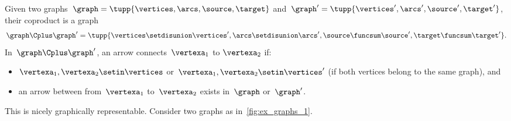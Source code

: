\begin{example}
    \label{def:ex_graph}
    Given two graphs~$\graph=\tupp{\vertices,\arcs,\source,\target}$ and~$\graph'=\tupp{\vertices',\arcs',\source',\target'}$, their coproduct is a graph
    \begin{equation}
        \graph\Cplus\graph'=\tupp{\vertices \setdisunion\vertices',\arcs \setdisunion\arcs',\source\funcsum\source',\target\funcsum\target'}.
    \end{equation}
    In~$\graph\Cplus\graph'$, an arrow connects~$\vertexa_1$ to $\vertexa_2$ if:
    \begin{itemize}
        \item $\vertexa_1,\vertexa_2\setin \vertices$ or~$\vertexa_1,\vertexa_2\setin \vertices'$ (if both vertices belong to the same graph), and
        \item an arrow between from~$\vertexa_1$ to~$\vertexa_2$ exists in~$\graph$ or~$\graph'$.
    \end{itemize}
    This is nicely graphically representable.
    Consider two graphs as in~\cref{fig:ex_graphs_1}.


\end{example}
